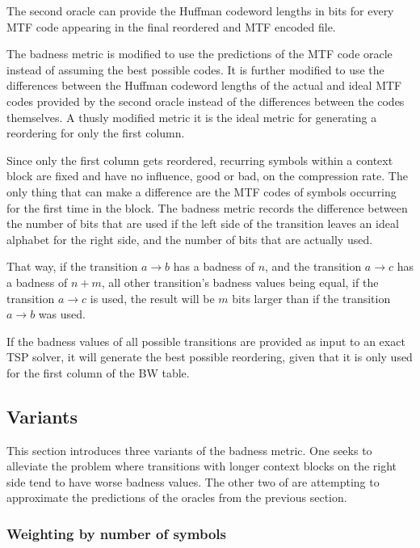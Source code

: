 \documentclass[a4paper]{scrreprt}
\begin{document}
The second oracle can provide the Huffman codeword lengths in bits for every MTF
code appearing in the final reordered and MTF encoded file.

The badness metric is modified to use the predictions of the MTF code oracle
instead of assuming the best possible codes. It is further modified to use the
differences between the Huffman codeword lengths of the actual and ideal MTF
codes provided by the second oracle instead of the differences between the
codes themselves. A thusly modified metric it is the ideal metric for generating
a reordering for only the first column.

Since only the first column gets reordered, recurring symbols within a context
block are fixed and have no influence, good or bad, on the compression rate. The
only thing that can make a difference are the MTF codes of symbols occurring for
the first time in the block. The badness metric records the difference between
the number of bits that are used if the left side of the transition leaves an
ideal alphabet for the right side, and the number of bits that are actually used.

That way, if the transition \(a \rightarrow b\) has a badness of \(n\), and the
transition \(a \rightarrow c\) has a badness of \(n + m\), all other
transition's badness values being equal, if the transition \(a \rightarrow c\)
is used, the result will be \(m\) bits larger than if the transition \(a
\rightarrow b\) was used.

If the badness values of all possible transitions are provided as input to an
exact TSP solver, it will generate the best possible reordering, given that it
is only used for the first column of the BW table.

\subsection{Variants}

This section introduces three variants of the badness metric. One seeks to
alleviate the problem where transitions with longer context blocks on the right
side tend to have worse badness values. The other two of are attempting to
approximate the predictions of the oracles from the previous section.

\subsubsection{Weighting by number of symbols}
\end{document}
